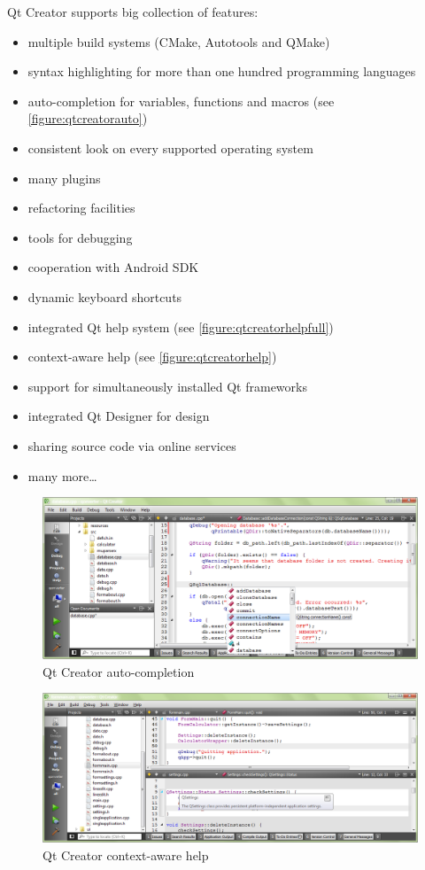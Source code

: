 Qt Creator supports big collection of features:
\begin{itemize}
\item multiple build systems (CMake, Autotools and QMake)
\item syntax highlighting for more than one hundred programming languages
\item auto-completion for variables, functions and macros (see \autoref{figure:qtcreatorauto})
\item consistent look on every supported operating system
\item many plugins
\item refactoring facilities
\item tools for debugging
\item cooperation with Android SDK
\item dynamic keyboard shortcuts
\item integrated Qt help system (see \autoref{figure:qtcreatorhelpfull})
\item context-aware help (see \autoref{figure:qtcreatorhelp})
\item support for simultaneously installed Qt frameworks
\item integrated Qt Designer for  design
\item sharing source code via online services
\item many more\ldots
\end{itemize}

\begin{figure}[ht]
\centering
\includegraphics[width=14.5cm]{graphics/laboratory/04-qtcreator-auto.png}
\caption{Qt Creator auto-completion}\label{figure:qtcreatorauto}
\end{figure}

\begin{figure}[ht]
\centering
\includegraphics[width=14.5cm]{graphics/laboratory/05-qtcreator-help.png}
\caption{Qt Creator context-aware help}\label{figure:qtcreatorhelp}
\end{figure}

